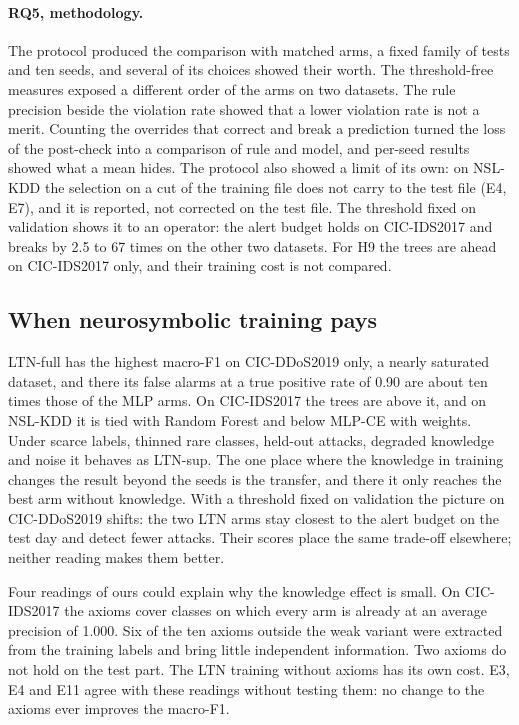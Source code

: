 \paragraph{RQ5, methodology.}
The protocol produced the comparison with matched arms, a fixed family of tests and ten seeds, and several of its choices
showed their worth. The threshold-free measures exposed a different order of the arms on two datasets. The rule precision
beside the violation rate showed that a lower violation rate is not a merit. Counting the overrides that correct and break
a prediction turned the loss of the post-check into a comparison of rule and model, and per-seed results showed what a
mean hides. The protocol also showed a limit of its own: on NSL-KDD the selection on a cut of the training file does not carry to the test file (E4,
E7), and it is reported, not corrected on the test file. The threshold fixed on validation shows it to an operator: the
alert budget holds on CIC-IDS2017 and breaks by 2.5 to 67 times on the other two datasets. For H9 the trees are ahead on
CIC-IDS2017 only, and their training cost is not compared.

\subsection{When neurosymbolic training pays}
\label{sec:res-when}

LTN-full has the highest macro-F1 on CIC-DDoS2019 only, a nearly saturated dataset, and there its false alarms at a true
positive rate of 0.90 are about ten times those of the MLP arms. On CIC-IDS2017 the trees are above it, and on NSL-KDD it
is tied with Random Forest and below MLP-CE with weights. Under scarce labels, thinned rare classes, held-out attacks,
degraded knowledge and noise it behaves as LTN-sup. The one place where the knowledge in training changes the result
beyond the seeds is the transfer, and there it only reaches the best arm without knowledge. With a threshold fixed on
validation the picture on CIC-DDoS2019 shifts: the two LTN arms stay closest to the alert budget on the test day
and detect fewer attacks. Their scores place the same trade-off elsewhere; neither reading makes them better.

Four readings of ours could explain why the knowledge effect is small. On CIC-IDS2017 the axioms cover classes on which
every arm is already at an average precision of 1.000. Six of the ten axioms outside the weak variant were extracted from
the training labels and bring little independent information. Two axioms do not hold on the test part. The LTN training
without axioms has its own cost. E3, E4 and E11 agree with these readings without testing them: no change to the axioms
ever improves the macro-F1.

